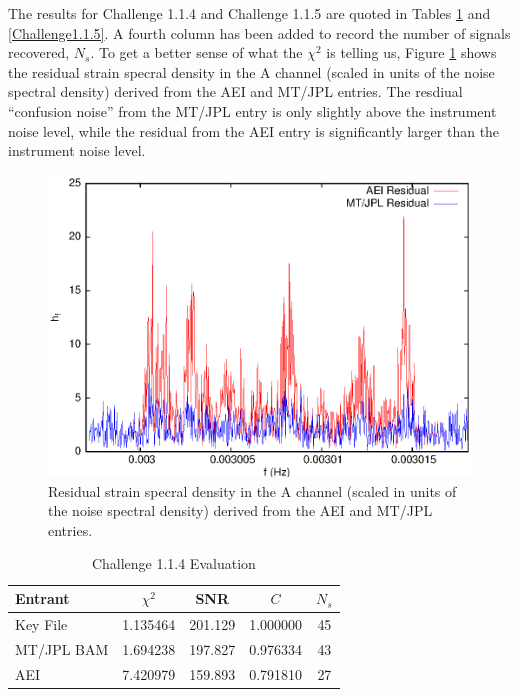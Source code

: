 \documentclass[11pt]{article}
\begin{document}
The results for
Challenge 1.1.4 and Challenge 1.1.5 are quoted in Tables \ref{Challenge1.1.4} and
\ref{Challenge1.1.5}. A fourth column has been added to record the number of
signals recovered, $N_s$. To get a better sense of what the $\chi^2$ is telling us,
Figure \ref{res1.1.4} shows the residual strain specral density in the A channel
(scaled in units of the noise spectral density) derived from the AEI and MT/JPL
entries. The resdiual ``confusion noise'' from the MT/JPL entry is only slightly
above the instrument noise level, while the residual from the AEI entry is significantly
larger than the instrument noise level.


\begin{figure}[h]
\includegraphics[angle=0,width=1.0\textwidth]{res_1.1.4.eps}
\caption{\label{res1.1.4}Residual strain specral density in the A channel
(scaled in units of the noise spectral density) derived from the AEI and MT/JPL
entries.}
\end{figure}

\begin{table}[t]
\caption{\label{Challenge1.1.4}Challenge 1.1.4 Evaluation}
\begin{center}
\begin{tabular}{|l|c|c|c|c|}
\hline
Entrant  & $\chi^2$ & SNR & $C$ & $N_s$\\
 \hline
Key File   & 1.135464 & 201.129 & 1.000000 & 45\\
MT/JPL BAM & 1.694238 & 197.827 & 0.976334 & 43\\
AEI        & 7.420979 & 159.893 & 0.791810 & 27\\
\hline  
\end{tabular}
\end{center}
\end{table}
\end{document}
